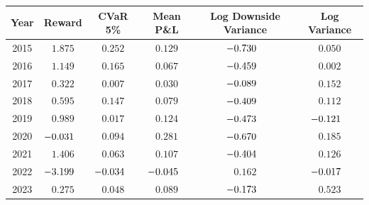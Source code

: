\begingroup
\renewcommand{\arraystretch}{1.15}
\setlength{\tabcolsep}{5pt}
\begin{tabular}{@{}cccccc@{}}
\toprule
Year & Reward & CVaR 5\% & Mean P\&L & Log Downside Variance & Log Variance \\
\midrule
2015 & $1.875$\sym{***} & $0.252$\sym{***} & $0.129$\sym{**} & $\mathllap{-}0.730$\sym{***} & $0.050$ \\
2016 & $1.149$\sym{***} & $0.165$\sym{*} & $0.067$\sym{*} & $\mathllap{-}0.459$\sym{***} & $0.002$ \\
2017 & $0.322$\sym{**} & $0.007$ & $0.030$\sym{***} & $\mathllap{-}0.089$\sym{**} & $0.152$\sym{**} \\
2018 & $0.595$ & $0.147$ & $0.079$\sym{**} & $\mathllap{-}0.409$\sym{*} & $0.112$ \\
2019 & $0.989$ & $0.017$ & $0.124$\sym{**} & $\mathllap{-}0.473$\sym{**} & $\mathllap{-}0.121$ \\
2020 & $\mathllap{-}0.031$ & $0.094$ & $0.281$\sym{**} & $\mathllap{-}0.670$\sym{***} & $0.185$ \\
2021 & $1.406$\sym{***} & $0.063$\sym{***} & $0.107$\sym{***} & $\mathllap{-}0.404$\sym{***} & $0.126$ \\
2022 & $\mathllap{-}3.199$\sym{***} & $\mathllap{-}0.034$ & $\mathllap{-}0.045$ & $0.162$ & $\mathllap{-}0.017$ \\
2023 & $0.275$ & $0.048$ & $0.089$\sym{***} & $\mathllap{-}0.173$\sym{*} & $0.523$\sym{***} \\
\bottomrule
\end{tabular}
\endgroup
